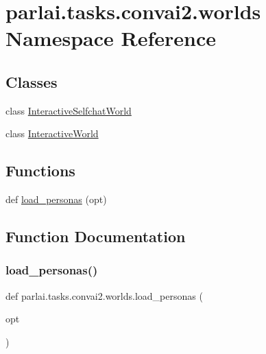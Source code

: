 \hypertarget{namespaceparlai_1_1tasks_1_1convai2_1_1worlds}{}\section{parlai.\+tasks.\+convai2.\+worlds Namespace Reference}
\label{namespaceparlai_1_1tasks_1_1convai2_1_1worlds}
\subsection*{Classes}
\begin{DoxyCompactItemize}
\item 
class \hyperlink{classparlai_1_1tasks_1_1convai2_1_1worlds_1_1InteractiveSelfchatWorld}{Interactive\+Selfchat\+World}
\item 
class \hyperlink{classparlai_1_1tasks_1_1convai2_1_1worlds_1_1InteractiveWorld}{Interactive\+World}
\end{DoxyCompactItemize}
\subsection*{Functions}
\begin{DoxyCompactItemize}
\item 
def \hyperlink{namespaceparlai_1_1tasks_1_1convai2_1_1worlds_a61a758b7cb43183397d002f7f203f586}{load\+\_\+personas} (opt)
\end{DoxyCompactItemize}


\subsection{Function Documentation}
\mbox{\label{namespaceparlai_1_1tasks_1_1convai2_1_1worlds_a61a758b7cb43183397d002f7f203f586}} 
\subsubsection{\texorpdfstring{load\+\_\+personas()}{load\_personas()}}
{\footnotesize\ttfamily def parlai.\+tasks.\+convai2.\+worlds.\+load\+\_\+personas (\begin{DoxyParamCaption}\item[{}]{opt }\end{DoxyParamCaption})}

